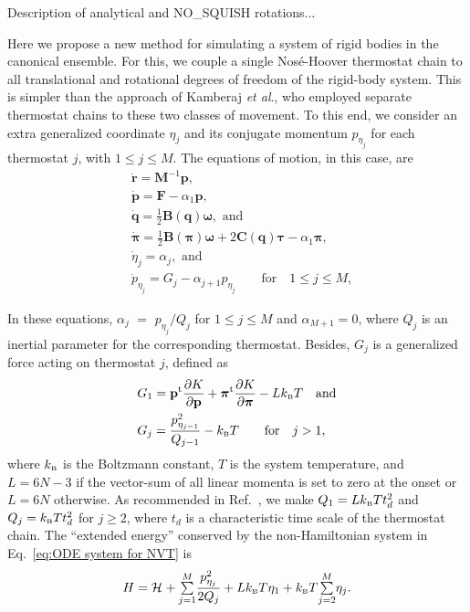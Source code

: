 \documentclass[
journal=jctcce,
layout=twocolumn
]{achemso}
\newcommand{\mt}[1]{\boldsymbol{\mathbf{#1}}}   %
\newcommand{\vt}[1]{\boldsymbol{\mathbf{#1}}}   %
\newcommand{\tr}[1]{#1^\text{t}}                %
\newcommand{\diff}[2]{\frac{\partial #1}{\partial #2}} %
\newcommand{\Ham}[1]{{\mathcal H}_\text{#1}}    %
\begin{document}
Description of analytical and NO\_SQUISH rotations...

Here we propose a new method for simulating a system of rigid bodies in the canonical ensemble. For this, we couple a single Nos\'{e}-Hoover thermostat chain \cite{Martyna_1992} to all translational and rotational degrees of freedom of the rigid-body system. This is simpler than the approach of Kamberaj \textit{et al}.,\cite{Kamberaj_2005} who employed separate thermostat chains to these two classes of movement. To this end, we consider an extra generalized coordinate $\eta_j$ and its conjugate momentum $p_{\eta_j}$ for each thermostat $j$, with $1 \leq j \le M$. The equations of motion, in this case, are
\begin{subequations}
	\label{eq:ODE system for NVT}
	\begin{align}
%
\label{eq:nhc_r}
	&\dot{\vt r} =
	{\mt M}^{-1} {\vt p}, \\
%
\label{eq:nhc_p} 
	&\dot{\vt p} =
	{\vt F} - \alpha_1 {\vt p},\\
%
\label{eq:nhc_q}
	&\dot{\vt q} =
	\frac{1}{2} \mt B(\vt q) \vt \omega, \text{ and} \\
%
\label{eq:nhc_pi}
	&\dot{\vt \pi} =
	\frac{1}{2} \mt B(\vt \pi) \vt \omega + 2 \mt C(\vt q) \vt \tau - \alpha_1 {\vt \pi}, \\
%
\label{eq:nhc_eta}
	&\dot{\eta}_j = \alpha_j, \text{ and} \\
%
\label{eq:nhc_p_eta}
	&{\dot p}_{\eta_j} = G_j - \alpha_{j+1} p_{\eta_j} \qquad \text{for} \quad 1 \leq j \le M,
	\end{align}
\end{subequations}

In these equations, $\alpha_j$ $=$ ${p_{\eta_j}}/{Q_j}$ for $1 \leq j \le M$ and $\alpha_{M+1} = 0$, where $Q_j$ is an inertial parameter for the corresponding thermostat. Besides, $G_j$ is a generalized force acting on thermostat $j$, defined as
\begin{subequations}
\begin{align}
\label{eq:generalized force NVT}
&G_1 = \tr{\vt p} \diff{K}{\vt p} + \tr{\vt \pi} \diff{K}{\vt \pi} - L k_\text{\tiny B} T \quad \text{and}\\
&G_j = \frac{p_{\eta_{j-1}}^2}{Q_{j-1}} - k_\text{\tiny B} T  \qquad \text{for} \quad j > 1,
\end{align}
\end{subequations}
where $k_\text{\tiny B}$ is the Boltzmann constant, $T$ is the system temperature, and $L = 6N-3$ if the vector-sum of all linear momenta is set to zero at the onset or $L = 6N$ otherwise.\cite{Martyna_1994} As recommended in Ref.~, we make $Q_1 = L k_\text{\tiny B} T t_d^2$ and $Q_j = k_\text{\tiny B} T t_d^2$ for $j \geq 2$, where $t_d$ is a characteristic time scale of the thermostat chain. The ``extended energy'' conserved by the non-Hamiltonian system in Eq.~\eqref{eq:ODE system for NVT} is \cite{Martyna_1992}
\begin{equation}
\label{eq:nvt extended energy}
H = \Ham{} + {\textstyle\sum\limits_{j=1}^{M}} \frac{p_{\eta_j}^2}{2Q_j} + L k_\text{\tiny B} T\eta_1 + k_\text{\tiny B} T {\textstyle\sum\limits_{j=2}^{M}} \eta_j.
\end{equation}
\end{document}
